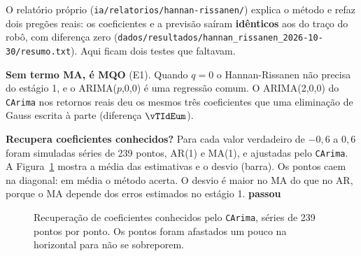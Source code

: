 \documentclass[11pt,a4paper]{article}
\newcommand{\arq}[1]{../../../dados/verificacao/testes_formulas_2026-10-30/#1}
\newcommand{\ok}{\textcolor{cok}{\textbf{passou}}}
\begin{document}
O relatório próprio (\nolinkurl{ia/relatorios/hannan-rissanen/}) explica o método e refaz dois pregões reais: os
coeficientes e a previsão saíram \textbf{idênticos} aos do traço do robô, com diferença zero
(\nolinkurl{dados/resultados/hannan_rissanen_2026-10-30/resumo.txt}). Aqui ficam dois testes que faltavam.

\textbf{Sem termo MA, é MQO} (E1). Quando $q = 0$ o Hannan-Rissanen não precisa do estágio 1, e o ARIMA($p$,0,0)
é uma regressão comum. O ARIMA(2,0,0) do \texttt{CArima} nos retornos reais deu os mesmos três coeficientes que
uma eliminação de Gauss escrita à parte (diferença $\vTIdEum$).

\textbf{Recupera coeficientes conhecidos?} Para cada valor verdadeiro de $-0{,}6$ a $0{,}6$ foram simuladas
\vTHrR{} séries de 239 pontos, AR(1) e MA(1), e ajustadas pelo \texttt{CArima}. A Figura~\ref{fig:hr} mostra a
média das estimativas e o desvio (barra). Os pontos caem na diagonal: em média o método acerta. O desvio é maior
no MA do que no AR, porque o MA depende dos erros estimados no estágio 1. \ok

\begin{figure}[htbp]
\centering
{}
\caption{Recuperação de coeficientes conhecidos pelo \texttt{CArima}, \vTHrR{} séries de 239 pontos por ponto.
Os pontos foram afastados um pouco na horizontal para não se sobreporem.}
\label{fig:hr}
\end{figure}
\end{document}
